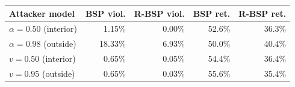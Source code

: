 \begin{tabular}{@{}lrrrr@{}}
\toprule
Attacker model & BSP viol. & R-BSP viol. & BSP ret. & R-BSP ret. \\
\midrule
$\alpha=0.50$ (interior) & 1.15\% & 0.00\% & 52.6\% & 36.3\% \\
$\alpha=0.98$ (outside) & 18.33\% & 6.93\% & 50.0\% & 40.4\% \\
$v=0.50$ (interior) & 0.65\% & 0.05\% & 54.4\% & 36.4\% \\
$v=0.95$ (outside) & 0.65\% & 0.03\% & 55.6\% & 35.4\% \\
\bottomrule
\end{tabular}
